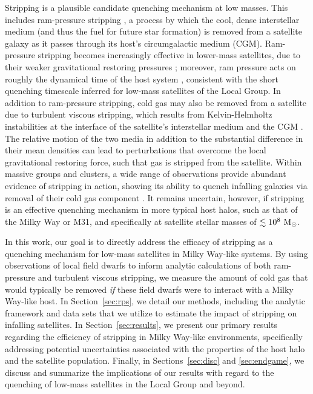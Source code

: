 Stripping is a plausible candidate quenching mechanism at low
masses. This includes ram-pressure stripping \citep{gunn72}, a
process by which the cool, dense interstellar medium (and thus the
fuel for future star formation) is removed from a satellite galaxy as
it passes through its host's circumgalactic medium (CGM).
%
Ram-pressure stripping becomes increasingly effective in lower-mass
satellites, due to their weaker gravitational restoring pressures
\citep{hester06}; moreover, ram pressure acts on roughly the dynamical
time of the host system \citep[i.e.~$1-3$~Gyr,][]{tonnesen07,
  bekki14}, consistent with the short quenching timescale inferred for
low-mass satellites of the Local Group.
%
In addition to ram-pressure stripping, cold gas may also be removed
from a satellite due to turbulent viscous stripping, which results
from Kelvin-Helmholtz instabilities at the interface of the
satellite's interstellar medium and the CGM \citep{nulsen82}.
%
The relative motion of the two media in addition to the substantial
difference in their mean densities can lead to perturbations that
overcome the local gravitational restoring force, such that gas is
stripped from the satellite.
%
Within massive groups and clusters, a wide range of observations
provide abundant evidence of stripping in action, showing its ability
to quench infalling galaxies via removal of their cold gas component
\citep[e.g.][]{ebeling14, kenney15}.
%
It remains uncertain, however, if stripping is an
effective quenching mechanism in more typical host halos, such as that
of the Milky Way or M31, and specifically at satellite stellar masses
of $\lesssim10^{8}~{\rm M}_{\odot}$.


In this work, our goal is to directly address the efficacy of
stripping as a quenching mechanism for low-mass satellites in Milky
Way-like systems. By using observations of local field dwarfs to
inform analytic calculations of both ram-pressure and turbulent
viscous stripping, we measure the amount of cold gas that would
typically be removed \emph{if} these field dwarfs were to interact
with a Milky Way-like host.
%
In Section~\ref{sec:rps}, we detail our methods, including the
analytic framework and data sets that we utilize to estimate the
impact of stripping on infalling satellites.
%
In Section~\ref{sec:results}, we present our primary results regarding
the efficiency of stripping in Milky Way-like environments,
specifically addressing potential uncertainties associated with the
properties of the host halo and the satellite population.
%
Finally, in Sections~\ref{sec:disc} and \ref{sec:endgame}, we discuss
and summarize the implications of our results with regard to the
quenching of low-mass satellites in the Local Group and beyond.



